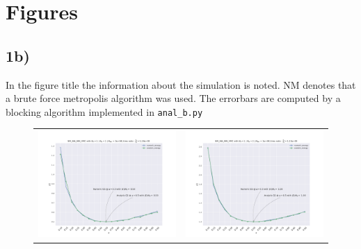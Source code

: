 \section{Figures}
\subsection{1b)}\label{app:fig}

In the figure title the information about the simulation is noted. NM denotes that a brute force metropolis  algorithm was used. The errorbars are computed by a blocking algorithm implemented in \lstinline{anal_b.py}

\begin{figure}
\hspace{-2.8cm}
\begin{tabular}{cc}
\includegraphics[width = 0.5\paperwidth]{figures/NM_NIA_NIN_np_1_nd_1.pdf} & \includegraphics[width = 0.5\paperwidth]{figures/NM_NIA_NIN_np_1_nd_2.pdf} \\

\end{tabular}
\end{figure}
